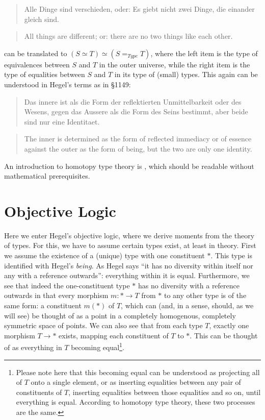 \documentclass{article}
\begin{document}
\begin{quote}
   Alle Dinge sind verschieden, oder: Es giebt nicht zwei Dinge, die einander gleich sind.
\end{quote}

\begin{quote}
    All things are different; or: there are no two things like each other.
\end{quote}

can be translated to $(S\simeq T)\simeq (S =_{Type} T)$, where the left item is the type of equivalences between $S$ and $T$ in the outer universe, while the right item is the type of equalities between $S$ and $T$ in its type of (small) types. This again can be understood in Hegel's terms as in §1149:

\begin{quote}
    Das innere ist als die Form der reflektierten Unmittelbarkeit oder des Wesens, gegen das Aussere als die Form des Seins bestimmt, aber beide sind nur eine Identitaet.
\end{quote}

\begin{quote}
    The inner is determined as the form of reflected immediacy or of essence against the outer as the form of being, but the two are only one identity.
\end{quote}

An introduction to homotopy type theory is \cite{hott}, which should be readable without mathematical prerequisites.


\section{Objective Logic}

Here we enter Hegel's objective logic, where we derive moments from the theory of types. For this, we have to assume certain types exist, at least in theory. First we assume the existence of a (unique) type with one constituent $*$. This type is identified with Hegel's \emph{being}. As Hegel says ``it has no diversity within itself nor any with a reference outwards'': everything within it is equal. Furthermore, we see that indeed the one-constituent type $*$ has no diversity with a reference outwards in that every morphism $m:*\rightarrow T$ from $*$ to any other type is of the same form: a constituent $m(*)$ of $T$, which can (and, in a sense, should, as we will see) be thought of as a point in a completely homogenous, completely symmetric space of points. We can also see that from each type $T$, exactly one morphism $T\rightarrow *$ exists, mapping each constituent of $T$ to $*$. This can be thought of as everything in $T$ becoming equal\footnote{Please note here that this becoming equal can be understood as projecting all of $T$ onto a single element, or as inserting equalities between any pair of constituents of $T$, inserting equalities between those equalities and so on, until everything is equal. According to homotopy type theory, these two processes are the same.}. \\ 
\end{document}
